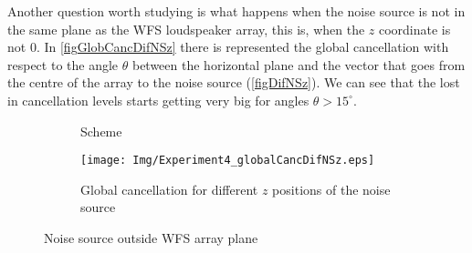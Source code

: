 %
%

Another question worth studying is what happens when the noise source is not in the same plane as the WFS loudspeaker array, this is, when the $z$ coordinate is not 0. In \autoref{figGlobCancDifNSz} there is represented the global cancellation with respect to the angle $\theta$ between the horizontal plane and the vector that goes from the centre of the array to the noise source (\autoref{figDifNSz}). We can see that the lost in cancellation levels starts getting very big for angles $\theta > 15^\circ$.

\begin{figure}[H]
	\centering
	\begin{subfigure}[b]{0.49\textwidth}
	\centering
	\def\svgwidth{\columnwidth}
	\graphicspath{{Img/}}
	
	\caption{Scheme}
	\label{figDifNSz}
	\end{subfigure}
	\begin{subfigure}[b]{0.49\textwidth}
	\centering
	\texttt{[image: Img/Experiment4\_globalCancDifNSz.eps]}
	\caption{Global cancellation for different $z$ positions of the noise source}
	\label{figGlobCancDifNSz}
\end{subfigure}
	\caption{Noise source outside WFS array plane}
\end{figure}

